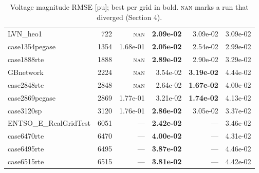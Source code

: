 \documentclass[10pt]{article}
\begin{document}
\begin{table}[H]
\begin{tabular}{lr rrrr}
LVN\_heo1 & 722 & \textsc{nan} & \textbf{2.09e-02} & 3.09e-02 & 3.09e-02 \\
case1354pegase & 1354 & 1.68e-01 & \textbf{2.05e-02} & 2.54e-02 & 2.99e-02 \\
case1888rte & 1888 & \textsc{nan} & \textbf{2.89e-02} & 2.90e-02 & 3.29e-02 \\
GBnetwork & 2224 & \textsc{nan} & 3.54e-02 & \textbf{3.19e-02} & 4.44e-02 \\
case2848rte & 2848 & \textsc{nan} & 2.64e-02 & \textbf{1.67e-02} & 4.00e-02 \\
case2869pegase & 2869 & 1.77e-01 & 3.21e-02 & \textbf{1.74e-02} & 4.13e-02 \\
case3120sp & 3120 & 1.76e-01 & \textbf{2.86e-02} & 3.05e-02 & 3.37e-02 \\
ENTSO\_E\_RealGridTest & 6051 & --- & \textbf{2.42e-02} & --- & 3.46e-02 \\
case6470rte & 6470 & --- & \textbf{4.00e-02} & --- & 4.31e-02 \\
case6495rte & 6495 & --- & \textbf{3.87e-02} & --- & 4.46e-02 \\
case6515rte & 6515 & --- & \textbf{3.81e-02} & --- & 4.42e-02 \\
\bottomrule
\end{tabular}
\caption{Voltage magnitude RMSE [pu]; best per grid in bold. \textsc{nan} marks a run that diverged (Section 4).}
\end{table}
\end{document}
